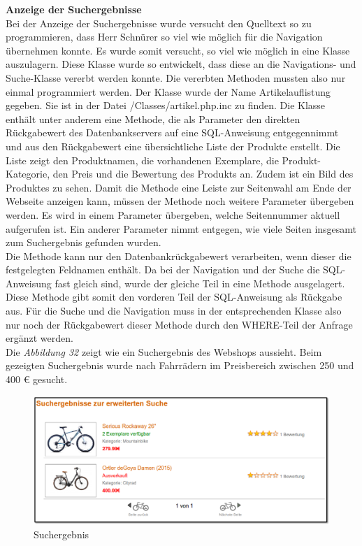 \textbf{Anzeige der Suchergebnisse}\\
Bei der Anzeige der Suchergebnisse wurde versucht den Quelltext so zu programmieren, dass Herr Schnürer so viel wie möglich für die Navigation übernehmen konnte. Es wurde somit versucht, so viel wie möglich in eine Klasse auszulagern. Diese Klasse wurde so entwickelt, dass diese an die Navigations- und Suche-Klasse vererbt werden konnte. Die vererbten Methoden mussten also nur einmal programmiert werden. Der Klasse wurde der Name \glqq Artikelauflistung\grqq{} gegeben. Sie ist in der Datei \glqq /Classes/artikel.php.inc\grqq{} zu finden. Die Klasse enthält unter anderem eine Methode, die als Parameter den direkten Rückgabewert des Datenbankservers auf eine SQL-Anweisung entgegennimmt und aus den Rückgabewert eine übersichtliche Liste der Produkte erstellt. Die Liste zeigt den Produktnamen, die vorhandenen Exemplare, die Produkt-Kategorie, den Preis und die Bewertung des Produkts an. Zudem ist ein Bild des Produktes zu sehen. Damit die Methode eine Leiste zur Seitenwahl am Ende der Webseite anzeigen kann, müssen der Methode noch weitere Parameter übergeben werden. Es wird in einem Parameter übergeben, welche Seitennummer aktuell aufgerufen ist. Ein anderer Parameter nimmt entgegen, wie viele Seiten insgesamt zum Suchergebnis gefunden wurden. \\
Die Methode kann nur den Datenbankrückgabewert verarbeiten, wenn dieser die festgelegten Feldnamen enthält. Da bei der Navigation und der Suche die SQL-Anweisung fast gleich sind, wurde der gleiche Teil in eine Methode ausgelagert. Diese Methode gibt somit den vorderen Teil der SQL-Anweisung als Rückgabe aus. Für die Suche und die Navigation muss in der entsprechenden Klasse also nur noch der Rückgabewert dieser Methode durch den \glqq WHERE-Teil \grqq{} der Anfrage ergänzt werden.\\
Die \textit{Abbildung 32} zeigt wie ein Suchergebnis des Webshops aussieht. Beim gezeigten Suchergebnis wurde nach Fahrrädern im Preisbereich zwischen 250 und 400 € gesucht.

\begin{figure}[H]
	\begin{center}
			\includegraphics[width=130mm]{Bilder/suchergebnis.png}
	\end{center}
	\caption{Suchergebnis}
\end{figure}

